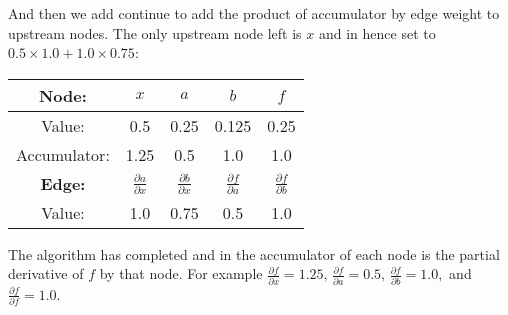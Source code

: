 And then we add continue to add the product of accumulator by edge weight to upstream nodes.
The only upstream node left is $x$ and in hence set to $0.5\times1.0+1.0\times0.75$:
\begin{multicols}{2}
	\columnbreak
	\centering
	\begin{center}
\begin{tabular}{|c|c|c|c|c|}
	\hline
	\bf Node:\phantom{\bigg|} &$x$&$a$&$b$&$f$\\
	\hline
	Value: &0.5&0.25&0.125&0.25\\
	Accumulator: &1.25&0.5&1.0&1.0\\
	\hline
	\hline
	\bf Edge:\phantom{\bigg|} &$\frac{\partial a}{\partial x}$&$\frac{\partial b}{\partial x}$&$\frac{\partial f}{\partial a}$&$\frac{\partial f}{\partial b}$\\
	\hline
	Value: &1.0&0.75&0.5&1.0\\
	\hline
\end{tabular}
	\end{center}
\end{multicols}

The algorithm has completed and in the accumulator of each node is the partial derivative of $f$ by that node.
For example $\frac{\partial f}{\partial x} = 1.25,\,\frac{\partial f}{\partial a} = 0.5,\,\frac{\partial f}{\partial b} = 1.0,$ and $\frac{\partial f}{\partial f} = 1.0$.
